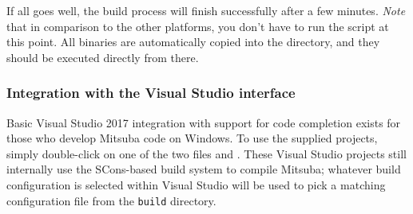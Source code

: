 If all goes well, the build process will finish successfully after a few
minutes. \emph{Note} that in comparison to the other platforms, you don't have to run the  script at this point.
All binaries are automatically copied into the  directory, and they should be executed directly from there.

\subsubsection{Integration with the Visual Studio interface}
Basic Visual Studio 2017 integration with support for code completion
exists for those who develop Mitsuba code on Windows.
To use the supplied projects, simply double-click on one of the two files 
and . These Visual Studio projects still internally
use the SCons-based build system to compile Mitsuba; whatever
build configuration is selected within Visual Studio will be used to pick a matching
configuration file from the \texttt{build} directory.

